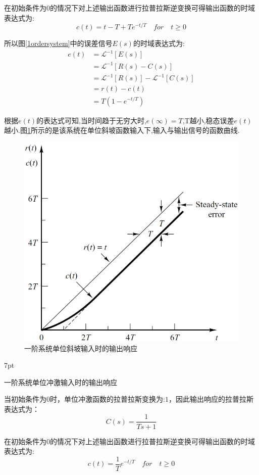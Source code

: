 \documentclass{article}
\numberwithin{equation}{section}
\numberwithin{figure}{section}
\newenvironment{formal}{%
\def\FrameCommand{%
\hspace{1pt}%
{\color{DarkBlue}\vrule width 2pt}%
{\color{formalshade}\vrule width 4pt}%
\colorbox{formalshade}%
}%
\MakeFramed{\advance\hsize-\width\FrameRestore}%
\noindent\hspace{-4.55pt}%
\begin{adjustwidth}{}{7pt}%
\vspace{2pt}\vspace{2pt}%
}
{%
\vspace{2pt}\end{adjustwidth}\endMakeFramed%
}
\begin{document}
在初始条件为0的情况下对上述输出函数进行拉普拉斯逆变换可得输出函数的时域表达式为:
\begin{equation}
    c(t)=t-T+Te^{-t/T} \quad for \quad t ≥ 0
\end{equation}

所以图\ref{1ordersystem}中的误差信号$E(s)$的时域表达式为:
\begin{equation}
    \begin{split}
        e(t)&=\mathscr{L}^{-1}[E(s)]\\
        &=\mathscr{L}^{-1}[R(s)-C(s)]\\
        &=\mathscr{L}^{-1}[R(s)]-\mathscr{L}^{-1}[C(s)]\\
        &=r(t)-c(t)\\
        &=T(1-e^{-t/T})
    \end{split}
\end{equation}

根据$e(t)$的表达式可知,当时间趋于无穷大时,$e(∞)=T$,T越小,稳态误差$e(t)$越小.图\ref{1orderunitrampresponse}所示的是该系统在单位斜坡函数输入下,输入与输出信号的函数曲线.
\begin{figure}
    \centering
    \includegraphics[width=.5\textwidth]{Chapter5/1orderunitrampresponse.png} %
    \caption{一阶系统单位斜坡输入时的输出响应} %
    \label{1orderunitrampresponse} %
\end{figure}

\begin{formal}
    一阶系统单位冲激输入时的输出响应
\end{formal}
当初始条件为0时，单位冲激函数的拉普拉斯变换为:$1$，因此输出响应的拉普拉斯表达式为：
\begin{equation}
    C(s)=\frac{1}{Ts+1}
\end{equation}

在初始条件为0的情况下对上述输出函数进行拉普拉斯逆变换可得输出函数的时域表达式为:
\begin{equation}
    c(t)=\frac{1}{T}e^{-t/T}    \quad for \quad t ≥ 0
\end{equation}
\end{document}
